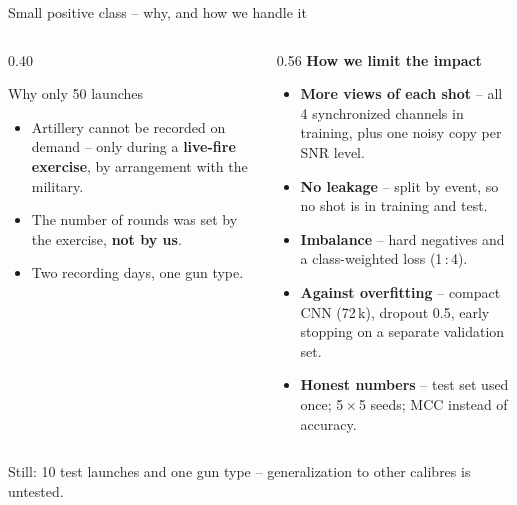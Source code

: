 \documentclass[aspectratio=169,10pt]{beamer}
\begin{document}
\begin{frame}{Small positive class -- why, and how we handle it}
  \begin{columns}[T,onlytextwidth]
    \begin{column}{0.40\textwidth}
      \begin{block}{\faCrosshairs\enspace Why only 50 launches}
        \small
        \begin{itemize}\small
          \item Artillery cannot be recorded on demand -- only during a
                \textbf{live-fire exercise}, by arrangement with the military.
          \item The number of rounds was set by the exercise, \textbf{not by us}.
          \item Two recording days, one gun type.
        \end{itemize}
      \end{block}
    \end{column}
    \begin{column}{0.56\textwidth}
      {\small\bfseries\color{ctublue}How we limit the impact}
      \begin{itemize}\small
        \item \textbf{More views of each shot} -- all 4 synchronized channels in training,
              plus one noisy copy per SNR level.
        \item \textbf{No leakage} -- split by event, so no shot is in training and test.
        \item \textbf{Imbalance} -- hard negatives and a class-weighted loss (1\,:\,4).
        \item \textbf{Against overfitting} -- compact CNN (72\,k), dropout 0.5, early
              stopping on a separate validation set.
        \item \textbf{Honest numbers} -- test set used once; 5\,$\times$\,5 seeds;
              MCC instead of accuracy.
      \end{itemize}
    \end{column}
  \end{columns}
  \vfill
  {\small\color{ink!70} Still: 10 test launches and one gun type -- generalization to
   other calibres is untested.}
\end{frame}
\end{document}
